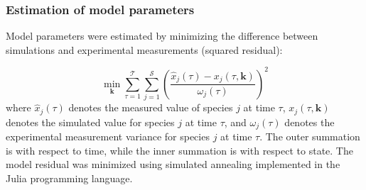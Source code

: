 \documentclass[10pt,twocolumn,twoside,final]{IEEEtran}
\begin{document}
\subsubsection*{Estimation of model parameters}
Model parameters were estimated by minimizing the difference between simulations and experimental measurements (squared residual):

\begin{equation}\label{eqn:objective-function}
	\min_{\mathbf{k}} \sum_{\tau=1}^{\mathcal{T}}\sum_{j=1}^{\mathcal{S}}\left(\frac{\hat{x}_{j}\left(\tau\right) - x_{j}\left(\tau,\mathbf{k}\right)}{\omega_{j}\left(\tau\right)}\right)^{2}
\end{equation}
where $\hat{x}_{j}\left(\tau\right)$ denotes the measured value of species $j$ at time $\tau$, $x_{j}\left(\tau,\mathbf{k}\right)$ denotes the simulated
value for species $j$ at time $\tau$, and $\omega_{j}\left(\tau\right)$ denotes the experimental measurement variance for species $j$ at time $\tau$.
The outer summation is with respect to time, while the inner summation is with respect to state. The model residual was minimized using simulated annealing implemented in the Julia programming language.



\end{document}
